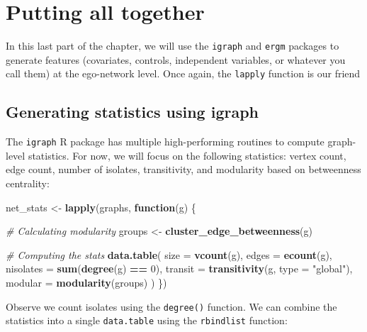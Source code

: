 \documentclass[
]{book}
\newenvironment{Shaded}{\begin{snugshade}}{\end{snugshade}}
\newcommand{\AttributeTok}[1]{\textcolor[rgb]{0.13,0.29,0.53}{#1}}
\newcommand{\CommentTok}[1]{\textcolor[rgb]{0.56,0.35,0.01}{\textit{#1}}}
\newcommand{\ControlFlowTok}[1]{\textcolor[rgb]{0.13,0.29,0.53}{\textbf{#1}}}
\newcommand{\DecValTok}[1]{\textcolor[rgb]{0.00,0.00,0.81}{#1}}
\newcommand{\FunctionTok}[1]{\textcolor[rgb]{0.13,0.29,0.53}{\textbf{#1}}}
\newcommand{\NormalTok}[1]{#1}
\newcommand{\OtherTok}[1]{\textcolor[rgb]{0.56,0.35,0.01}{#1}}
\newcommand{\SpecialCharTok}[1]{\textcolor[rgb]{0.81,0.36,0.00}{\textbf{#1}}}
\newcommand{\StringTok}[1]{\textcolor[rgb]{0.31,0.60,0.02}{#1}}
\begin{document}
\hypertarget{putting-all-together}{%
\section{Putting all together}\label{putting-all-together}}

In this last part of the chapter, we will use the \texttt{igraph} and \texttt{ergm} packages to generate features (covariates, controls, independent variables, or whatever you call them) at the ego-network level. Once again, the \texttt{lapply} function is our friend

\hypertarget{generating-statistics-using-igraph}{%
\subsection{Generating statistics using igraph}\label{generating-statistics-using-igraph}}

The \texttt{igraph} R package has multiple high-performing routines to compute graph-level statistics. For now, we will focus on the following statistics: vertex count, edge count, number of isolates, transitivity, and modularity based on betweenness centrality:

\begin{Shaded}
\begin{Highlighting}[]
\NormalTok{net\_stats }\OtherTok{\textless{}{-}} \FunctionTok{lapply}\NormalTok{(graphs, }\ControlFlowTok{function}\NormalTok{(g) \{}
  
  \CommentTok{\# Calculating modularity}
\NormalTok{  groups }\OtherTok{\textless{}{-}} \FunctionTok{cluster\_edge\_betweenness}\NormalTok{(g)}
  
  \CommentTok{\# Computing the stats}
  \FunctionTok{data.table}\NormalTok{(}
    \AttributeTok{size      =} \FunctionTok{vcount}\NormalTok{(g),}
    \AttributeTok{edges     =} \FunctionTok{ecount}\NormalTok{(g),}
    \AttributeTok{nisolates =} \FunctionTok{sum}\NormalTok{(}\FunctionTok{degree}\NormalTok{(g) }\SpecialCharTok{==} \DecValTok{0}\NormalTok{),}
    \AttributeTok{transit   =} \FunctionTok{transitivity}\NormalTok{(g, }\AttributeTok{type =} \StringTok{"global"}\NormalTok{),}
    \AttributeTok{modular   =} \FunctionTok{modularity}\NormalTok{(groups)}
\NormalTok{  )}
\NormalTok{\})}
\end{Highlighting}
\end{Shaded}

Observe we count isolates using the \texttt{degree()} function. We can combine the statistics into a single \texttt{data.table} using the \texttt{rbindlist} function:
\end{document}

